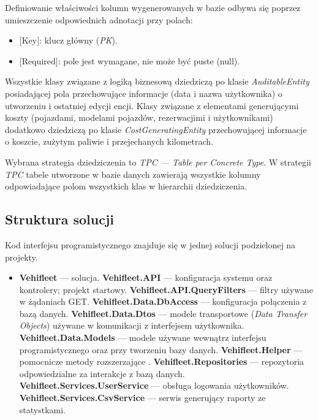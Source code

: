 \documentclass[eng,printmode,openany]{mgr}
\begin{document}
	Definiowanie właściwości kolumn wygenerowanych w bazie odbywa się poprzez umieszczenie odpowiednich adnotacji przy polach:
	\begin{itemize}
		\item $[$Key$]$: klucz główny (\textit{PK}).
		\item $[$Required$]$: pole jest wymagane, nie może być puste (null).
	\end{itemize}
	
	
	
	
	
	Wszystkie klasy związane z logiką biznesową dziedziczą po klasie \textit{AuditableEntity} posiadającej pola przechowujące informacje (data i nazwa użytkownika) o utworzeniu i ostatniej edycji encji. Klasy związane z elementami generującymi koszty (pojazdami, modelami pojazdów, rezerwacjimi i użytkownikami) dodatkowo dziedziczą po klasie \textit{CostGeneratingEntity} przechowującej informacje o koszcie, zużytym paliwie i przejechanych kilometrach. 
	
	Wybrana strategia dziedziczenia to \textit{TPC — Table per Concrete Type}. W strategii \textit{TPC} tabele utworzone w bazie danych zawierają wszystkie kolumny odpowiadające polom wszystkich klas w hierarchii dziedziczenia.
	
	
	
	
	
	\subsection{Struktura solucji}
	Kod interfejsu programistycznego znajduje się w jednej solucji podzielonej na projekty.
	\begin{itemize}
		\item \textbf{Vehifleet} — solucja.
		\subitem \textbf{Vehifleet.API} — konfiguracja systemu oraz kontrolery; projekt startowy.
		\subitem \textbf{Vehifleet.API.QueryFilters} — filtry używane w żądaniach GET.
		\subitem \textbf{Vehifleet.Data.DbAccess} — konfiguracja połączenia z bazą danych.
		\subitem \textbf{Vehifleet.Data.Dtos} — modele transportowe (\textit{Data Transfer Objects}) używane w komunikacji z interfejsem użytkownika.
		\subitem \textbf{Vehifleet.Data.Models} — modele używane wewnątrz interfejsu programistycznego oraz przy tworzeniu bazy danych.
		\subitem \textbf{Vehifleet.Helper} — pomocnicze metody rozszerzające \cite{msdn-extension}.
		\subitem \textbf{Vehifleet.Repositories} — repozytoria odpowiedzialne za interakcje z bazą danych.
		\subitem \textbf{Vehifleet.Services.UserService} — obsługa logowania użytkowników.
		\subitem \textbf{Vehifleet.Services.CsvService} — serwis generujący raporty ze statystkami.
	\end{itemize}
\end{document}
